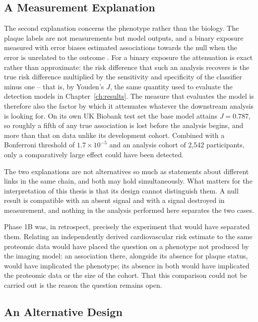 \subsection{A Measurement Explanation}

The second explanation concerns the phenotype rather than the biology. The plaque labels are not
measurements but model outputs, and a binary exposure measured with error biases estimated
associations towards the null when the error is unrelated to the outcome
\cite{bross1954misclassification, copeland1977bias}. For a binary exposure the attenuation is
exact rather than approximate: the risk difference that such an analysis recovers is the true
risk difference multiplied by the sensitivity and specificity of the classifier minus one --
that is, by Youden's $J$, the same quantity used to evaluate the detection models in
Chapter~\ref{ch:results}. The measure that evaluates the model is therefore also the factor by
which it attenuates whatever the downstream analysis is looking for. On its own UK Biobank test
set the base model attains $J = 0.787$, so roughly a fifth of any true association is lost before
the analysis begins, and more than that on data unlike its development cohort. Combined with a Bonferroni threshold of
$1.7 \times 10^{-5}$ and an analysis cohort of 2{,}542 participants, only a comparatively large
effect could have been detected.

The two explanations are not alternatives so much as statements about different links in the same
chain, and both may hold simultaneously. What matters for the interpretation of this thesis is
that its design cannot distinguish them. A null result is compatible with an absent signal and
with a signal destroyed in measurement, and nothing in the analysis performed here separates the
two cases.

Phase 1B was, in retrospect, precisely the experiment that would have separated them. Relating an
independently derived cardiovascular risk estimate to the same proteomic data would have placed
the question on a phenotype not produced by the imaging model: an association there, alongside
its absence for plaque status, would have implicated the phenotype; its absence in both would
have implicated the proteomic data or the size of the cohort. That this comparison could not be
carried out is the reason the question remains open.

\subsection{An Alternative Design}

